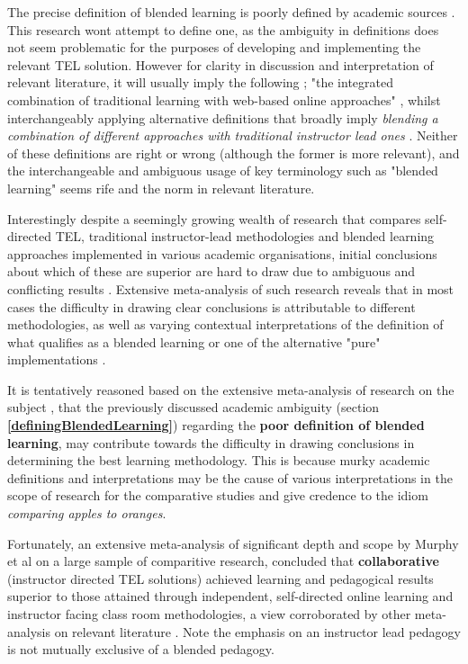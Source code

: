 The precise definition of blended learning is poorly defined by academic sources \cite{Oliver2005}. This research wont attempt to define one, as the ambiguity in definitions does not seem problematic for the purposes of developing and implementing the relevant TEL solution. However for clarity in discussion and interpretation of relevant literature, it will usually imply the following ; "the integrated combination of traditional learning with web-based online approaches" \cite{Oliver2005}, whilst interchangeably applying alternative definitions that broadly imply \textit{blending a combination of different approaches with traditional instructor lead ones} \cite{Oliver2005,Sana2011}. Neither of these definitions are right or wrong (although the former is more relevant), and the interchangeable and ambiguous usage of key terminology such as "blended learning" seems rife and the norm in relevant literature\cite{Oliver2005,Sana2011}.

Interestingly despite a seemingly growing wealth of research that compares self-directed TEL, traditional instructor-lead methodologies and blended learning approaches implemented in various academic organisations, initial conclusions about which of these are superior are hard to draw due to ambiguous and conflicting results \cite{Means2009}. Extensive meta-analysis of such research \cite{RickReis,Means2009,Team2008} reveals that in most cases the  difficulty in drawing clear conclusions is attributable to different methodologies, as well as varying contextual interpretations of the definition of what qualifies as a blended learning or one of the alternative "pure" implementations .

It is tentatively reasoned based on the extensive meta-analysis of research on the subject \cite{Means2009,Team2008,RickReis}, that the previously discussed academic ambiguity (section \textbf{\ref{definingBlendedLearning}}) regarding the \textbf{poor definition of blended learning}, may contribute towards the difficulty in drawing conclusions in determining the best learning methodology. This is because murky academic definitions and interpretations may be the cause of various interpretations in the scope of research for the comparative studies \cite{Means2009,RickReis,Team2008} and give credence to the idiom \textit{comparing apples to oranges}.

Fortunately, an extensive meta-analysis of significant depth and scope by Murphy et al \cite{Means2009} on a large sample of comparitive research,  concluded that \textbf{collaborative} (instructor directed TEL solutions)  achieved learning and pedagogical results superior to those attained through independent, self-directed online learning \cite{RickReis} and instructor facing class room methodologies, a view corroborated by other  meta-analysis on relevant literature  \cite{Means2009,Team2008,RickReis}. Note the emphasis on an instructor lead pedagogy is not mutually exclusive of a blended pedagogy.

